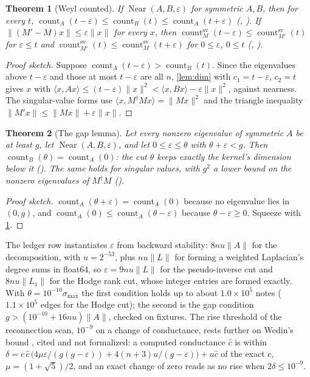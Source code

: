 \documentclass[11pt]{article}
\theoremstyle{plain}
\newtheorem{theorem}{Theorem}[section]
\theoremstyle{definition}
\theoremstyle{remark}
\newcommand{\norm}[1]{\lVert #1 \rVert}
\newcommand{\inner}[2]{\langle #1, #2 \rangle}
\newcommand{\cnt}{\operatorname{count}}
\newcommand{\countSV}{\operatorname{count}^{\mathrm{sv}}}
\begin{document}
\begin{theorem}[Weyl counted]\label{thm:weyl}
If $\operatorname{Near}(A, B, \varepsilon)$ for symmetric $A, B$, then for every $t$,
$\cnt_A(t - \varepsilon) \le \cnt_B(t) \le \cnt_A(t + \varepsilon)$
(, ). If
$\norm{(M' - M)x} \le \varepsilon\norm{x}$ for every $x$, then $\countSV_M(t - \varepsilon) \le
\countSV_{M'}(t)$ for $\varepsilon \le t$ and $\countSV_{M'}(t) \le \countSV_M(t + \varepsilon)$
for $0 \le \varepsilon$, $0 \le t$ (,
).
\end{theorem}

\begin{proof}[Proof sketch]
Suppose $\cnt_A(t - \varepsilon) > \cnt_B(t)$. Since the eigenvalues above $t - \varepsilon$
and those at most $t - \varepsilon$ are all $n$, \cref{lem:dim} with $c_1 = t - \varepsilon$,
$c_2 = t$ gives $x$ with $\inner{x}{Ax} \le (t - \varepsilon)\norm{x}^2 < \inner{x}{Bx} -
\varepsilon\norm{x}^2$, against nearness. The singular-value forms use $\inner{x}{M^\dagger Mx}
= \norm{Mx}^2$ and the triangle inequality $\norm{M'x} \le \norm{Mx} + \varepsilon\norm{x}$.
\end{proof}

\begin{theorem}[The gap lemma]\label{thm:gap}
Let every nonzero eigenvalue of symmetric $A$ be at least $g$, let
$\operatorname{Near}(A, B, \varepsilon)$, and let $0 \le \varepsilon \le \theta$ with
$\theta + \varepsilon < g$. Then $\cnt_B(\theta) = \cnt_A(0)$: the cut $\theta$ keeps exactly
the kernel's dimension below it (). The same holds for
singular values, with $g^2$ a lower bound on the nonzero eigenvalues of $M^\dagger M$
().
\end{theorem}

\begin{proof}[Proof sketch]
$\cnt_A(\theta + \varepsilon) = \cnt_A(0)$ because no eigenvalue lies in $(0, g)$, and
$\cnt_A(0) \le \cnt_A(\theta - \varepsilon)$ because $\theta - \varepsilon \ge 0$. Squeeze
with \cref{thm:weyl}.
\end{proof}

The ledger row instantiates $\varepsilon$ from backward stability: $8nu\norm{A}$ for the
decomposition, with $u = 2^{-53}$, plus $nu\norm{L}$ for forming a weighted Laplacian's degree
sums in float64, so $\varepsilon = 9nu\norm{L}$ for the pseudo-inverse cut and $8nu\norm{L_1}$
for the Hodge rank cut, whose integer entries are formed exactly. With
$\theta = 10^{-10}\sigma_{\max}$ the first condition holds up to about $1.0\times 10^5$ notes
($1.1\times 10^5$ edges for the Hodge cut); the second is the gap condition
$g > (10^{-10} + 16nu)\norm{A}$, checked on fixtures. The rise threshold of the reconnection
scan, $10^{-9}$ on a change of conductance, rests further on Wedin's bound \citep{wedin1973},
cited and not formalized: a computed conductance $\hat c$ is within
$\delta = c\,\hat c\,\bigl(4\mu\varepsilon/(g(g - \varepsilon)) + 4(n + 3)u/(g - \varepsilon)\bigr) +
u\hat c$ of the exact $c$, $\mu = (1 + \sqrt 5)/2$, and an exact change of zero reads as no rise
when $2\delta \le 10^{-9}$.
\end{document}
